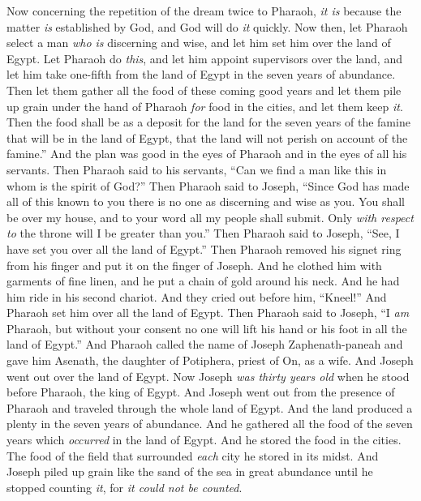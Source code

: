 \begin{biblechapter}
\verse Now concerning the repetition of the dream twice to Pharaoh, \textit{it is} because the matter \textit{is} established by God, and God will do \textit{it} quickly.
\verse Now then, let Pharaoh select a man \textit{who is} discerning and wise, and let him set him over the land of Egypt.
\verse Let Pharaoh do \textit{this}, and let him appoint supervisors over the land, and let him take one-fifth from the land of Egypt in the seven years of abundance.
\verse Then let them gather all the food of these coming good years and let them pile up grain under the hand of Pharaoh \textit{for} food in the cities, and let them keep \textit{it}.
\verse Then the food shall be as a deposit for the land for the seven years of the famine that will be in the land of Egypt, that the land will not perish on account of the famine.”
 And the plan was good in the eyes of Pharaoh and in the eyes of all his servants.
\verse Then Pharaoh said to his servants, “Can we find a man like this in whom is the spirit of God?”
\verse Then Pharaoh said to Joseph, “Since God has made all of this known to you there is no one as discerning and wise as you.
\verse You shall be over my house, and to your word all my people shall submit. Only \textit{with respect to} the throne will I be greater than you.”
\verse Then Pharaoh said to Joseph, “See, I have set you over all the land of Egypt.”
\verse Then Pharaoh removed his signet ring from his finger and put it on the finger of Joseph. And he clothed him with garments of fine linen, and he put a chain of gold around his neck.
\verse And he had him ride in his second chariot. And they cried out before him, “Kneel!” And Pharaoh set him over all the land of Egypt.
\verse Then Pharaoh said to Joseph, “I \textit{am} Pharaoh, but without your consent no one will lift his hand or his foot in all the land of Egypt.”
\verse And Pharaoh called the name of Joseph Zaphenath-paneah and gave him Asenath, the daughter of Potiphera, priest of On, as a wife. And Joseph went out over the land of Egypt.
\verse Now Joseph \textit{was thirty years old} when he stood before Pharaoh, the king of Egypt. And Joseph went out from the presence of Pharaoh and traveled through the whole land of Egypt.
\verse And the land produced a plenty in the seven years of abundance.
\verse And he gathered all the food of the seven years which \textit{occurred} in the land of Egypt. And he stored the food in the cities. The food of the field that surrounded \textit{each} city he stored in its midst.
\verse And Joseph piled up grain like the sand of the sea in great abundance until he stopped counting \textit{it}, for \textit{it could not be counted}.

\end{biblechapter}
